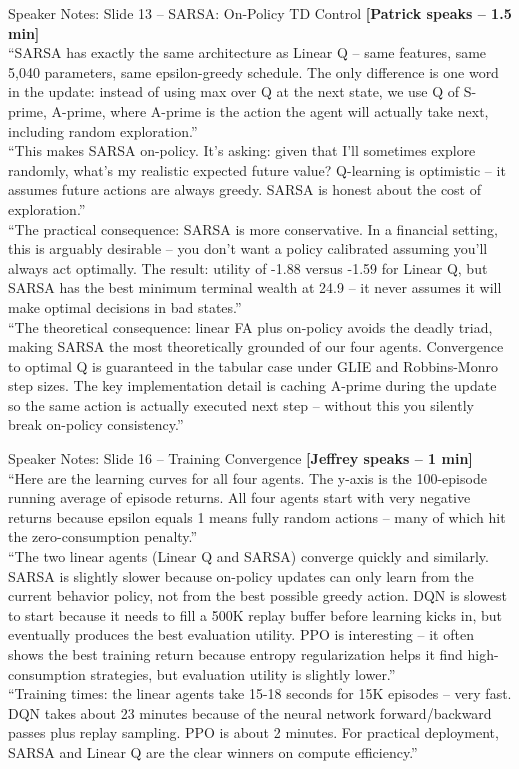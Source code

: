\documentclass[aspectratio=169, 11pt]{beamer}
\begin{document}
\begin{frame}[allowframebreaks]{Speaker Notes: Slide 13 -- SARSA: On-Policy TD Control}
\textbf{[Patrick speaks -- 1.5 min]}\\
``SARSA has exactly the same architecture as Linear Q -- same features, same 5,040 parameters, same epsilon-greedy schedule. The only difference is one word in the update: instead of using max over Q at the next state, we use Q of S-prime, A-prime, where A-prime is the action the agent will actually take next, including random exploration.''\\[0.5em]
``This makes SARSA on-policy. It's asking: given that I'll sometimes explore randomly, what's my realistic expected future value? Q-learning is optimistic -- it assumes future actions are always greedy. SARSA is honest about the cost of exploration.''\\[0.5em]
``The practical consequence: SARSA is more conservative. In a financial setting, this is arguably desirable -- you don't want a policy calibrated assuming you'll always act optimally. The result: utility of -1.88 versus -1.59 for Linear Q, but SARSA has the best minimum terminal wealth at 24.9 -- it never assumes it will make optimal decisions in bad states.''\\[0.5em]
``The theoretical consequence: linear FA plus on-policy avoids the deadly triad, making SARSA the most theoretically grounded of our four agents. Convergence to optimal Q is guaranteed in the tabular case under GLIE and Robbins-Monro step sizes. The key implementation detail is caching A-prime during the update so the same action is actually executed next step -- without this you silently break on-policy consistency.''
\end{frame}

\begin{frame}[allowframebreaks]{Speaker Notes: Slide 16 -- Training Convergence}
\textbf{[Jeffrey speaks -- 1 min]}\\
``Here are the learning curves for all four agents. The y-axis is the 100-episode running average of episode returns. All four agents start with very negative returns because epsilon equals 1 means fully random actions -- many of which hit the zero-consumption penalty.''\\[0.5em]
``The two linear agents (Linear Q and SARSA) converge quickly and similarly. SARSA is slightly slower because on-policy updates can only learn from the current behavior policy, not from the best possible greedy action. DQN is slowest to start because it needs to fill a 500K replay buffer before learning kicks in, but eventually produces the best evaluation utility. PPO is interesting -- it often shows the best training return because entropy regularization helps it find high-consumption strategies, but evaluation utility is slightly lower.''\\[0.5em]
``Training times: the linear agents take 15-18 seconds for 15K episodes -- very fast. DQN takes about 23 minutes because of the neural network forward/backward passes plus replay sampling. PPO is about 2 minutes. For practical deployment, SARSA and Linear Q are the clear winners on compute efficiency.''
\end{frame}
\end{document}
